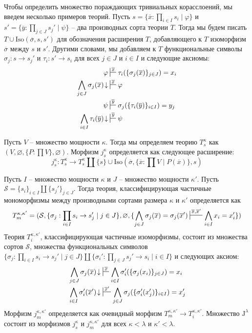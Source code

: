 \documentclass[reqno]{amsart}
\theoremstyle{definition}
\theoremstyle{remark}
\newcommand{\fs}[1]{\mathrm{#1}}
\newcommand{\J}{\mathrm{J}}
\begin{document}
Чтобы определить множество пораждающих тривиальных корасслоений, мы введем несколько примеров теорий.
Пусть $s = \{ \overline{x} : \prod_{i \in I} s_i \mid \varphi \}$ и $s' = \{ \overline{y} : \prod_{j \in J} s_j' \mid \psi \}$ -- два производных сорта теории $T$.
Тогда мы будем писать $T \cup \fs{Iso}(\overline{\sigma},s,s')$ для обозначения расширения $T$, добавляющего к $T$ изоморфизм $\overline{\sigma}$ между $s$ и $s'$.
Другими словами, мы добавляем к $T$ функциональные символы $\sigma_j : s \to s_j'$ и $\tau_i : s' \to s_i$ для всех $j \in J$ и $i \in I$ и следующие аксиомы:
\begin{align*}
\varphi & \sststile{}{\overline{x}} \tau_i(\{ \sigma_j(\overline{x}) \}_{j \in J}) = x_i \\
\bigwedge_{j \in J} \sigma_j(\overline{x})\!\downarrow & \sststile{}{\overline{x}} \varphi \\
\psi & \sststile{}{\overline{y}} \sigma_j(\{ \tau_i(\overline{y}) \}_{i \in I}) = y_j \\
\bigwedge_{i \in I} \tau_i(\overline{y})\!\downarrow & \sststile{}{\overline{y}} \psi
\end{align*}

Пусть $V$ -- множество мощности $\kappa$.
Тогда мы определяем теорию $T^\kappa_s$ как $(V, \varnothing, \{ P : \prod V \}, \varnothing)$.
Морфизм $j^\kappa_s$ определяется как следующее расширение:
\[ j^\kappa_s : T^\kappa_s \to T^\kappa_s \amalg \{ s \} \cup \fs{Iso}(\overline{\sigma}, \{ \overline{x} : \prod V \mid P(\overline{x}) \}, s) \]

Пусть $I$ -- множество мощности $\kappa$ и $J$ -- множество мощности $\kappa'$.
Пусть $\mathcal{S} = \{ s_i \}_{i \in I} \amalg \{ s_j' \}_{j \in J}$.
Тогда теория, классифицирующая частичные мономорфизмы между производными сортами размера $\kappa$ и $\kappa'$ определяется как
\[ T_m^{\kappa,\kappa'} = (\mathcal{S}, \{ \sigma_j : \prod_{i \in I} s_i \to s_j' \mid j \in J \}, \varnothing, \{ \bigwedge_{j \in J} \sigma_j(\overline{x}) = \sigma_j(\overline{x}') \sststile{}{\overline{x},\overline{x}'} \bigwedge_{i \in I} x_i = x_i' \}) \]
Теория $T_i^{\kappa,\kappa'}$, классифицирующая частичные изоморфизмы, состоит из множества сортов $\mathcal{S}$, множества функциональных символов $\{ \sigma_j : \prod_{i \in I} s_i \to s_j' \mid j \in J \} \amalg \{ \sigma_i' : \prod_{j \in J} s_j' \to s_i \mid i \in I \}$ и следующих аксиом:
\begin{align*}
& \bigwedge_{j \in J} \sigma_j(\overline{x})\!\downarrow\ \sststile{}{\overline{x}} \bigwedge_{i \in I} \sigma_i'(\{ \sigma_j(x_i) \}_{j \in J}) = x_i \\
& \bigwedge_{i \in I} \sigma_i'(\overline{x}')\!\downarrow\ \sststile{}{\overline{x}'} \bigwedge_{j \in J} \sigma_j(\{ \sigma_i'(x_j') \}_{i \in I}) = x_j'
\end{align*}
Морфизм $j_m^{\kappa,\kappa'}$ определяется как очевидный морфизм $T_m^{\kappa,\kappa'} \to T_i^{\kappa,\kappa'}$.
Множество $\J^\lambda$ состоит из морфизмов $j^\kappa_s$ и $j_m^{\kappa,\kappa'}$ для всех $\kappa < \lambda$ и $\kappa' < \lambda$.
\end{document}
